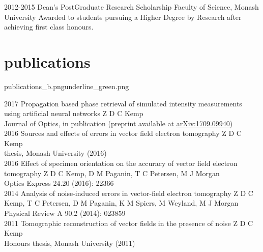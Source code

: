 \documentclass[a4paper]{friggeri-cv} %
\newcommand{\spacer}{\vspace{0.0cm}}
\begin{document}
\begin{entrylist}


\entry
{2012-2015\phantom{XXX}}
{Dean's PostGraduate Research Scholarship}
{Faculty of Science, Monash University}
{Awarded to students pursuing a Higher Degree by Research after achieving first class honours.}


\end{entrylist}


\newpage
{}

\spacer
\section{publications}{publications_b.png}{underline_green.png}
\begin{entrylist}
\entry
{2017}
{Propagation based phase retrieval of simulated intensity measurements using artificial neural networks}
{}
{Z D C Kemp\\ Journal of Optics, in publication (preprint available at \href{https://arxiv.org/abs/1709.09940}{arXiv:1709.09940})\\}
\entry
{2016}
{Sources and effects of errors in vector field electron tomography}
{}
{Z D C Kemp\\ \phd{} thesis, Monash University (2016)\\}
\entry
{2016}
{Effect of specimen orientation on the accuracy of vector field electron tomography}
{}
{Z D C Kemp, D M Paganin, T C Petersen, M J Morgan\\Optics Express 24.20 (2016): 22366\\}
\entry
{2014}
{Analysis of noise-induced errors in vector-field electron tomography}
{}
{Z D C Kemp, T C Petersen, D M Paganin, K M Spiers, M Weyland, M J Morgan\\Physical Review A 90.2 (2014): 023859\\}
\entry
{2011}
{Tomographic reconstruction of vector fields in the presence of noise}
{}
{Z D C Kemp\\ Honours thesis, Monash University (2011)\\}
\end{entrylist}
\end{document}
